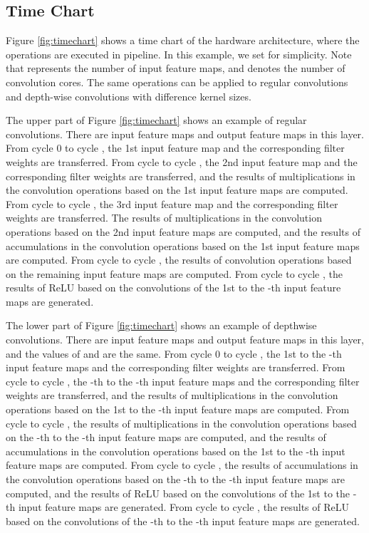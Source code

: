 \documentclass[runningheads]{llncs}
\begin{document}
\subsection{Time Chart}
\label{subsec:timechart}

Figure \ref{fig:timechart} shows a time chart of the hardware architecture, where the operations are executed in pipeline. In this example, we set  for simplicity. Note that  represents the number of input feature maps, and  denotes the number of convolution cores. The same operations can be applied to regular convolutions and depth-wise convolutions with difference kernel sizes.

The upper part of Figure \ref{fig:timechart} shows an example of regular convolutions. There are  input feature maps and  output feature maps in this layer. From cycle 0 to cycle , the 1st input feature map and the corresponding filter weights are transferred. From cycle  to cycle , the 2nd input feature map and the corresponding filter weights are transferred, and the results of multiplications in the convolution operations based on the 1st input feature maps are computed. From cycle  to cycle , the 3rd input feature map and the corresponding filter weights are transferred. The results of multiplications in the convolution operations based on the 2nd input feature maps are computed, and the results of accumulations in the convolution operations based on the 1st input feature maps are computed. From cycle  to cycle , the results of convolution operations based on the remaining input feature maps are computed. From cycle  to cycle , the results of ReLU based on the convolutions of the 1st to the -th input feature maps are generated. 

The lower part of Figure \ref{fig:timechart} shows an example of depthwise convolutions. There are  input feature maps and  output feature maps in this layer, and the values of  and  are the same. From cycle 0 to cycle , the 1st to the -th input feature maps and the corresponding filter weights are transferred. From cycle  to cycle , the -th to the -th input feature maps and the corresponding filter weights are transferred, and the results of multiplications in the convolution operations based on the 1st to the -th input feature maps are computed. From cycle  to cycle , the results of multiplications in the convolution operations based on the -th to the -th input feature maps are computed, and the results of accumulations in the convolution operations based on the 1st to the -th input feature maps are computed. From cycle  to cycle , the results of accumulations in the convolution operations based on the -th to the -th input feature maps are computed, and the results of ReLU based on the convolutions of the 1st to the -th input feature maps are generated. From cycle  to cycle , the results of ReLU based on the convolutions of the -th to the -th input feature maps are generated. 
\end{document}
